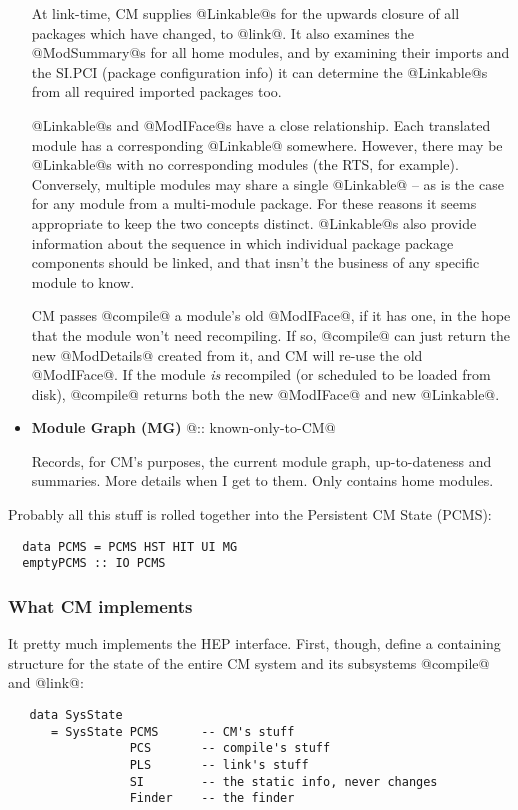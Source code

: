 \documentclass[11pt]{article}
\begin{document}
\begin{itemize}
   At link-time, CM supplies @Linkable@s for the upwards closure of
   all packages which have changed, to @link@.  It also examines the
   @ModSummary@s for all home modules, and by examining their imports
   and the SI.PCI (package configuration info) it can determine the
   @Linkable@s from all required imported packages too.

   @Linkable@s and @ModIFace@s have a close relationship.  Each
   translated module has a corresponding @Linkable@ somewhere.
   However, there may be @Linkable@s with no corresponding modules
   (the RTS, for example).  Conversely, multiple modules may share a
   single @Linkable@ -- as is the case for any module from a
   multi-module package.  For these reasons it seems appropriate to
   keep the two concepts distinct.  @Linkable@s also provide
   information about the sequence in which individual package package
   components should be linked, and that insn't the business of any
   specific module to know.

   CM passes @compile@ a module's old @ModIFace@, if it has one, in
   the hope that the module won't need recompiling.  If so, @compile@
   can just return the new @ModDetails@ created from it, and CM will
   re-use the old @ModIFace@.  If the module {\em is} recompiled (or 
   scheduled to be loaded from disk), @compile@ returns both the 
   new @ModIFace@ and new @Linkable@.

\item 
   {\bf Module Graph (MG)} @:: known-only-to-CM@

   Records, for CM's purposes, the current module graph,
   up-to-dateness and summaries.  More details when I get to them.
   Only contains home modules.
\end{itemize}
Probably all this stuff is rolled together into the Persistent CM
State (PCMS):
\begin{verbatim}
  data PCMS = PCMS HST HIT UI MG
  emptyPCMS :: IO PCMS
\end{verbatim}

\subsubsection{What CM implements}
It pretty much implements the HEP interface.  First, though, define a 
containing structure for the state of the entire CM system and its
subsystems @compile@ and @link@:
\begin{verbatim}
   data SysState 
      = SysState PCMS      -- CM's stuff
                 PCS       -- compile's stuff
                 PLS       -- link's stuff
                 SI        -- the static info, never changes
                 Finder    -- the finder
\end{verbatim}
\end{document}
